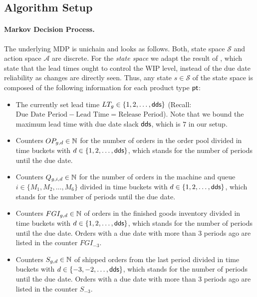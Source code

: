 \documentclass[envcountsame]{llncs}
\newcommand\MS[2][r]{\ifx t#1 \textcolor{blue}{[\textbf{MS:} #2]}
  \else \begin{center}\textcolor{blue}{\textbf{MS:} #2} \end{center} \fi}
\begin{document}
\subsection{Algorithm Setup}
\label{subsec:Algorithm_Setup}

\paragraph{Markov Decision Process.} The underlying MDP is unichain and looks as follows. Both,
state space $\mathcal{S}$ and action space $\mathcal{A}$ are discrete.
%
%
For the \textit{state space} we adapt the result of \citet{knollmann2013control}, which state that
the lead times ought to control the WIP level, instead of the due date reliability as changes are
directly seen. Thus, any state $s \in \mathcal{S}$ of the state space is composed of the following
information for each product type \(\mathsf{pt}\):
\begin{itemize}

\item The currently set lead time $LT_{g} \in \{1,2,\ldots,\textsf{dds}\}$ (Recall:
  $\text{Due Date Period} - \text{Lead Time} = \text{Release Period}$). Note that we bound the
  maximum lead time with due date slack $\textsf{dds}$, which is $7$ in our setup.

\item Counters $OP_{g,d}\in \mathbb{N}$ for the number of orders in the order pool divided in time buckets
  with $d \in \{1,2,\ldots,\textsf{dds} \}$, which stands for the number of periods until the due date.


\item Counters $Q_{g,i,d}\in \mathbb{N}$ for the number of orders in the machine and queue \(i \in
  \{M_{1}, M_{2}, \ldots , M_{6}\}\) divided in
  time buckets with $d \in \{1,2,\ldots,\textsf{dds} \}$, which stands for the number of periods until the
  due date.

\item Counters $FGI_{g,d} \in \mathbb{N}$ of orders in the finished goods inventory divided in time
  buckets with $d \in \{1, 2,\ldots, \textsf{dds} \}$, which stands for the number of periods until the
  due date. Orders with a due date with more than 3 periods ago are listed in the counter
  $FGI_{-3}$.

\item Counters $S_{g,d} \in \mathbb{N}$ of shipped orders from the last period divided in time buckets
  with $d \in\{-3,-2,\ldots, \textsf{dds} \}$, which stands for the number of periods until the due date.
  Orders with a due date with more than 3 periods ago are listed in the counter $S_{-3}$.

\end{itemize}
\end{document}
